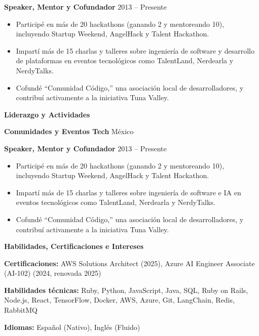 \documentclass[11pt]{article}
\begin{document}
{\textbf{Speaker, Mentor y Cofundador} \hfill 2013 -- Presente
\begin{itemize}[noitemsep, topsep=0pt, partopsep=0pt, parsep=0pt]
    \item Participé en más de 20 hackathons (ganando 2 y mentoreando 10), incluyendo Startup Weekend, AngelHack y Talent Hackathon.
    \item Impartí más de 15 charlas y talleres sobre ingeniería de software y desarrollo de plataformas en eventos tecnológicos como TalentLand, Nerdearla y NerdyTalks.
    \item Cofundé ``Comunidad Código,'' una asociación local de desarrolladores, y contribuí activamente a la iniciativa Tuna Valley.
\end{itemize}
}{
\begin{center}
    \textbf{Liderazgo y Actividades}
\end{center}

\textbf{Comunidades y Eventos Tech} \hfill México

\textbf{Speaker, Mentor y Cofundador} \hfill 2013 -- Presente
\begin{itemize}[noitemsep, topsep=0pt, partopsep=0pt, parsep=0pt]
    \item Participé en más de 20 hackathons (ganando 2 y mentoreando 10), incluyendo Startup Weekend, AngelHack y Talent Hackathon.
    \item Impartí más de 15 charlas y talleres sobre ingeniería de software e IA en eventos tecnológicos como TalentLand, Nerdearla y NerdyTalks.
    \item Cofundé ``Comunidad Código,'' una asociación local de desarrolladores, y contribuí activamente a la iniciativa Tuna Valley.
\end{itemize}
}

\vspace{12pt}

\begin{center}
    \textbf{Habilidades, Certificaciones e Intereses}
\end{center}

\textbf{Certificaciones:} AWS Solutions Architect (2025), Azure AI Engineer Associate (AI-102) (2024, renovada 2025)

\textbf{Habilidades técnicas:} Ruby, Python, JavaScript, Java, SQL, Ruby on Rails, Node.js, React, TensorFlow, Docker, AWS, Azure, Git, LangChain, Redis, RabbitMQ

\textbf{Idiomas:} Español (Nativo), Inglés (Fluido)
\end{document}
